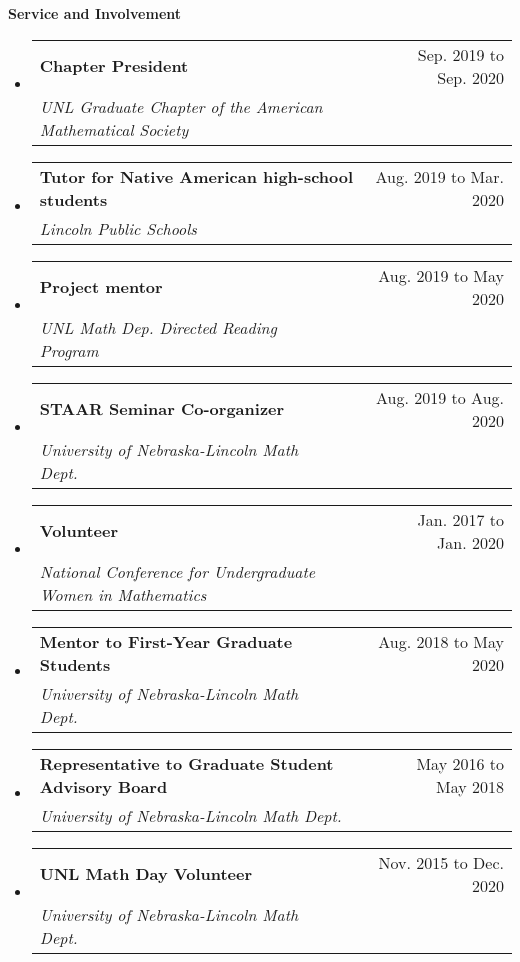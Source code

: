 \documentclass[letterpaper,11pt]{article}
\makeatletter
\newcommand{\resheading}[1]{{\large \colorbox{mygrey}{\begin{minipage}{\textwidth}{\textbf{#1 \vphantom{p\^{E}}}}\end{minipage}}}}
\newcommand{\ressubheading}[4]{
\begin{tabular*}{6.5in}{l@{\extracolsep{\fill}}r}
		\textbf{#1} & #2 \\
		\textit{#3} & \textit{#4} \\
\end{tabular*}\vspace{-6pt}}
\makeatother
\begin{document}
\begin{samepage}	
\resheading{Service and Involvement}
	\begin{itemize}
		\item
			\ressubheading{Chapter President}{Sep. 2019 to Sep. 2020}{UNL Graduate Chapter of the American Mathematical Society}{}
		\item 
			\ressubheading{Tutor for Native American high-school students}{Aug. 2019 to Mar. 2020}{Lincoln Public Schools}{}
		\item
			\ressubheading{Project mentor}{Aug. 2019 to May 2020}{UNL Math Dep. Directed Reading Program}{}
		\item
			\ressubheading{STAAR Seminar Co-organizer}{Aug. 2019 to Aug. 2020}{University of Nebraska-Lincoln Math Dept.}{}
		\item
			\ressubheading{Volunteer}{Jan. 2017 to Jan. 2020}{National Conference for Undergraduate Women in Mathematics}{}
		\item
			\ressubheading{Mentor to First-Year Graduate Students}{Aug. 2018 to May 2020}{University of Nebraska-Lincoln Math Dept.}{}
		\item
			\ressubheading{Representative to Graduate Student Advisory Board}{May 2016 to May 2018}{University of Nebraska-Lincoln Math Dept.}{}
		\item
			\ressubheading{UNL Math Day Volunteer}{Nov. 2015 to Dec. 2020}{University of Nebraska-Lincoln Math Dept.}{}
		
	\end{itemize}			
\end{samepage}
			
%
\end{document}
